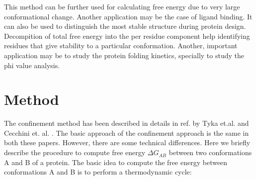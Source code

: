 \documentclass[12pt]{article}
\begin{document}
This method can be further used for calculating free energy due to very large conformational change. Another application may be
the case of ligand binding. It can also be used to distinguish the most stable structure during protein design. Decompition of 
total free energy into the per residue component help identifying residues that give stability to a particular conformation. 
Another, important application may be to study the protein folding kinetics, specially to study the phi value analysis.            

\section{Method}

The confinement method has been described in details in ref. by Tyka et.al. \cite{Tyka2006} and 
Cecchini et. al. \cite{Cecchini2009}. The basic approach of the confinement approach is the same in both
these papers. However, there are some technical differences. Here we briefly describe the procedure
to compute free energy $\Delta G_{AB}$ between two conformations A and B of a protein. The basic
idea to compute the free energy between conformations A and B is to perform a thermodynamic cycle: 
\end{document}
